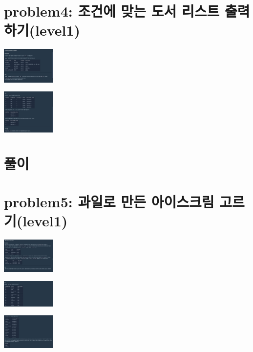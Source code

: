 \documentclass[11pt]{article}
\begin{document}
\section*{problem4: 조건에 맞는 도서 리스트 출력하기(level1)}
\label{sec:orgd387b19}
\begin{center}
\includegraphics[width=100px]{../static/img/sql/p4-1.png}
\end{center}
\begin{center}
\includegraphics[width=100px]{../static/img/sql/p4-2.png}
\end{center}

\section*{풀이}
\label{sec:org79852a1}

\section*{problem5: 과일로 만든 아이스크림 고르기(level1)}
\label{sec:orgd4b263c}
\begin{center}
\includegraphics[width=100px]{../static/img/sql/p5-1.png}
\end{center}

\begin{center}
\includegraphics[width=100px]{../static/img/sql/p5-2.png}
\end{center}

\begin{center}
\includegraphics[width=100px]{../static/img/sql/p5-3.png}
\end{center}
\end{document}
